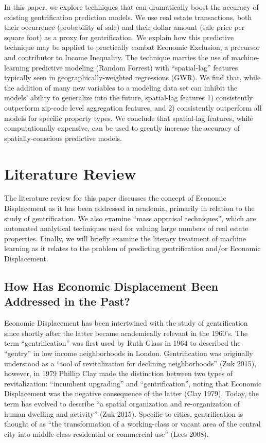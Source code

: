 \documentclass[12pt,]{article}
\begin{document}
In this paper, we explore techniques that can dramatically boost the
accuracy of existing gentrification prediction models. We use real
estate transactions, both their occurrence (probability of sale) and
their dollar amount (sale price per square foot) as a proxy for
gentrification. We explain how this predictive technique may be applied
to practically combat Economic Exclusion, a precursor and contributor to
Income Inequality. The technique marries the use of machine-learning
predictive modeling (Random Forrest) with ``spatial-lag'' features
typically seen in geographically-weighted regressions (GWR). We find
that, while the addition of many new variables to a modeling data set
can inhibit the models' ability to generalize into the future,
spatial-lag features 1) consistently outperform zip-code level
aggregation features, and 2) consistently outperform all models for
specific property types. We conclude that spatial-lag features, while
computationally expensive, can be used to greatly increase the accuracy
of spatially-conscious predictive models.

\hypertarget{literature-review}{%
\section{Literature Review}\label{literature-review}}

The literature review for this paper discusses the concept of Economic
Displacement as it has been addressed in academia, primarily in relation
to the study of gentrification. We also examine ``mass appraisal
techniques'', which are automated analytical techniques used for valuing
large numbers of real estate properties. Finally, we will briefly
examine the literary treatment of machine learning as it relates to the
problem of predicting gentrification and/or Economic Displacement.

\hypertarget{how-has-economic-displacement-been-addressed-in-the-past}{%
\subsection{How Has Economic Displacement Been Addressed in the
Past?}\label{how-has-economic-displacement-been-addressed-in-the-past}}

Economic Displacement has been intertwined with the study of
gentrification since shortly after the latter became academically
relevant in the 1960's. The term ``gentrification'' was first used by
Ruth Glass in 1964 to described the ``gentry'' in low income
neighborhoods in London. Gentrification was originally understood as a
``tool of revitalization for declining neighborhoods'' (Zuk 2015),
however, in 1979 Phillip Clay made the distinction between two types of
revitalization: ``incumbent upgrading'' and ``gentrification'', noting
that Economic Displacement was the negative consequence of the latter
(Clay 1979). Today, the term has evolved to describe ``a spatial
organization and re-organization of human dwelling and activity'' (Zuk
2015). Specific to cities, gentrification is thought of as ``the
transformation of a working-class or vacant area of the central city
into middle-class residential or commercial use'' (Lees 2008).
\end{document}
